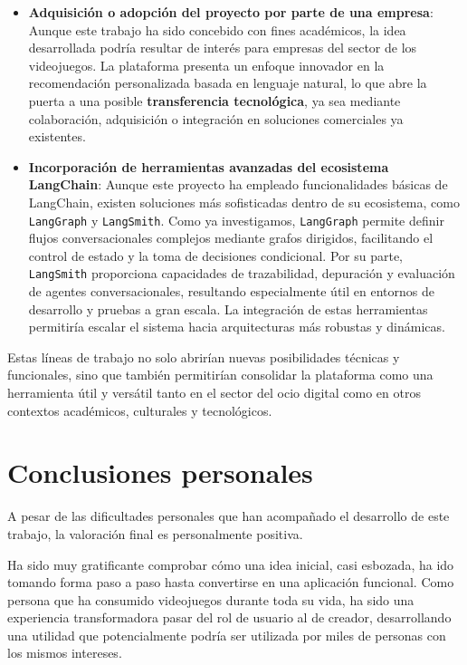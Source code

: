 \begin{itemize}
	
	\item \textbf{Adquisición o adopción del proyecto por parte de una empresa}:
	Aunque este trabajo ha sido concebido con fines académicos, la idea desarrollada podría resultar de interés para empresas del sector de los videojuegos. La plataforma presenta un enfoque innovador en la recomendación personalizada basada en lenguaje natural, lo que abre la puerta a una posible \textbf{transferencia tecnológica}, ya sea mediante colaboración, adquisición o integración en soluciones comerciales ya existentes.
	
	
	\item \textbf{Incorporación de herramientas avanzadas del ecosistema LangChain}:
	Aunque este proyecto ha empleado funcionalidades básicas de LangChain, existen soluciones más sofisticadas dentro de su ecosistema, como \texttt{LangGraph} y \texttt{LangSmith}. Como ya investigamos, \texttt{LangGraph} permite definir flujos conversacionales complejos mediante grafos dirigidos, facilitando el control de estado y la toma de decisiones condicional. Por su parte, \texttt{LangSmith} proporciona capacidades de trazabilidad, depuración y evaluación de agentes conversacionales, resultando especialmente útil en entornos de desarrollo y pruebas a gran escala. La integración de estas herramientas permitiría escalar el sistema hacia arquitecturas más robustas y dinámicas.
	
\end{itemize}

Estas líneas de trabajo no solo abrirían nuevas posibilidades técnicas y funcionales, sino que también permitirían consolidar la plataforma como una herramienta útil y versátil tanto en el sector del ocio digital como en otros contextos académicos, culturales y tecnológicos.


\newpage
\section{Conclusiones personales}

A pesar de las dificultades personales que han acompañado el desarrollo de este trabajo, la valoración final es personalmente positiva.

Ha sido muy gratificante comprobar cómo una idea inicial, casi esbozada, ha ido tomando forma paso a paso hasta convertirse en una aplicación funcional. Como persona que ha consumido videojuegos durante toda su vida, ha sido una experiencia transformadora pasar del rol de usuario al de creador, desarrollando una utilidad que potencialmente podría ser utilizada por miles de personas con los mismos intereses.

